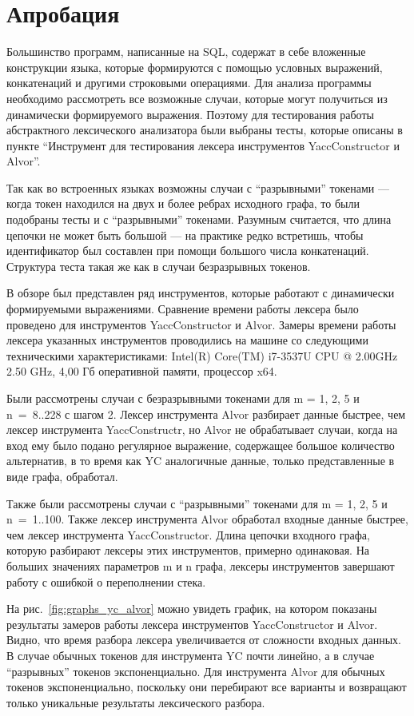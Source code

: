 \section{Апробация}
Большинство  программ, написанные на SQL, содержат в себе вложенные конструкции языка, которые формируются с помощью условных выражений, конкатенаций и другими строковыми операциями. 
Для анализа программы необходимо рассмотреть все возможные случаи, которые могут получиться из динамически формируемого выражения. Поэтому для тестирования работы абстрактного лексического анализатора были выбраны тесты, которые описаны в пункте ``Инструмент для тестирования лексера инструментов YaccConstructor и Alvor''.

Так как во встроенных языках возможны случаи с ``разрывными'' токенами --- когда токен находился на двух и более ребрах исходного графа, то были подобраны тесты и 
с ``разрывными'' токенами. Разумным считается, что длина цепочки не может быть большой --- на практике редко встретишь, чтобы идентификатор был составлен при помощи
большого числа конкатенаций. Структура теста такая же как в случаи безразрывных токенов. 

В обзоре был представлен ряд инструментов, которые работают с динамически формируемыми выражениями. Сравнение времени работы лексера было проведено
для инструментов YaccConstructor и Alvor. Замеры времени работы лексера указанных инструментов проводились на машине со следующими техническими характеристиками:
Intel(R) Core(TM) i7-3537U CPU @ 2.00GHz 2.50 GHz, 4,00 Гб оперативной памяти, процессор x64.

Были рассмотрены случаи с безразрывными токенами для m = 1, 2, 5 и n~=~8..228 с шагом 2. Лексер инструмента Alvor разбирает данные быстрее, чем лексер инструмента YaccConstructr, но Alvor не обрабатывает случаи, когда на вход ему 
было подано регулярное выражение, содержащее большое количество альтернатив, в то  время как YC аналогичные данные, только представленные 
в виде графа,  обработал. 

Также были рассмотрены случаи с ``разрывными'' токенами для m = 1, 2, 5 и n~=~1..100.
Также лексер инструмента Alvor обработал входные данные быстрее, чем лексер инструмента YaccConstructor. Длина цепочки входного графа, которую разбирают лексеры этих инструментов, примерно одинаковая. 
На больших значениях параметров m и n графа, лексеры инструментов завершают работу с ошибкой о переполнении стека. 

На рис.~\ref{fig:graphs_yc_alvor} можно увидеть график, 
на котором показаны результаты замеров работы лексера инструментов YaccConstructor и Alvor. 
Видно, что время разбора лексера увеличивается от сложности входных данных. В случае обычных токенов для инструмента YC почти линейно, а в случае 
``разрывных'' токенов экспоненциально. Для инструмента Alvor для обычных токенов экспоненциально, поскольку они перебирают все варианты и возвращают 
только уникальные результаты лексического разбора. 

